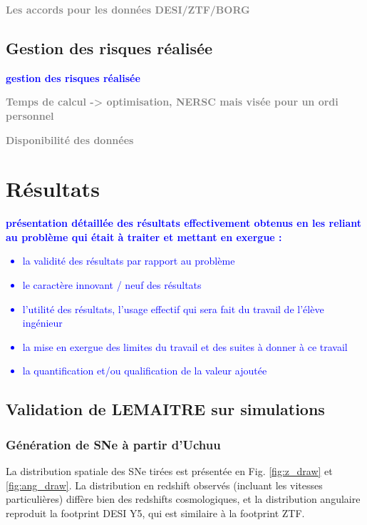\documentclass{book}
\newcommand{\todo}[1]{{\textcolor{gray}{\bf \large #1}}}
\newcommand{\consignes}[1]{{\textcolor{blue}{\bf \large #1}}}
\begin{document}
\todo{Les accords pour les données DESI/ZTF/BORG}


\section{Gestion des risques réalisée}
\consignes{gestion des risques réalisée}

\todo{Temps de calcul -> optimisation, NERSC mais visée pour un ordi personnel}

\todo{Disponibilité des données}



\chapter{Résultats}
\consignes{présentation détaillée des résultats effectivement obtenus en les reliant au problème qui était à traiter et mettant en exergue :
\begin{itemize}
\item la validité des résultats par rapport au problème
\item le caractère innovant / neuf des résultats
\item l’utilité des résultats, l’usage effectif qui sera fait du travail de l’élève ingénieur
\item la mise en exergue des limites du travail et des suites à donner à ce travail
\item la quantification et/ou qualification de la valeur ajoutée
\end{itemize}}


\section{Validation de LEMAITRE sur simulations}

\subsection{Génération de SNe à partir d'Uchuu}

La distribution spatiale des SNe tirées est présentée en Fig. \ref{fig:z_draw} et \ref{fig:ang_draw}. La distribution en redshift observés (incluant les vitesses particulières) diffère bien des redshifts cosmologiques, et la distribution angulaire reproduit la footprint DESI Y5, qui est similaire à la footprint ZTF.
\end{document}
